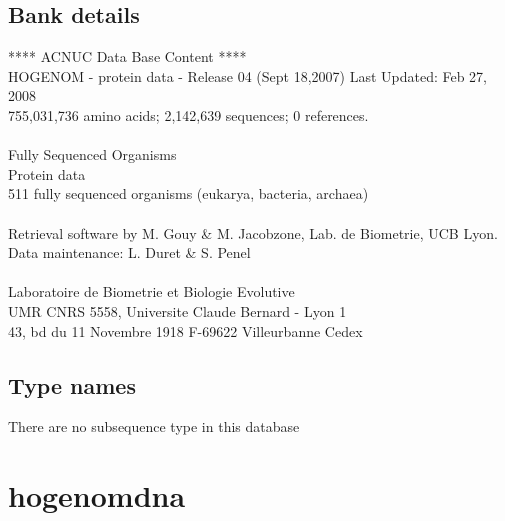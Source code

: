 \documentclass{article}
\begin{document}
\begin{Schunk}
\subsection{Bank details}
               ****     ACNUC Data Base Content      ****                      \\
 HOGENOM - protein data - Release 04 (Sept 18,2007) Last Updated: Feb 27, 2008\\
          755,031,736 amino acids; 2,142,639 sequences; 0 references.\\
                                                                               \\
                        Fully Sequenced Organisms\\
   				Protein data \\
	  511 fully sequenced organisms (eukarya, bacteria, archaea)\\
\\
Retrieval software by M. Gouy \& M. Jacobzone, Lab. de Biometrie, UCB Lyon.\\
Data maintenance: L. Duret \& S. Penel\\
\\
Laboratoire de Biometrie et Biologie Evolutive\\
UMR CNRS 5558, Universite Claude Bernard - Lyon 1 \\
43, bd du 11 Novembre 1918 F-69622 Villeurbanne Cedex\\


\subsection{Type names}
There are no subsequence type in this database
\section{ hogenomdna }

\end{Schunk}
\end{document}

